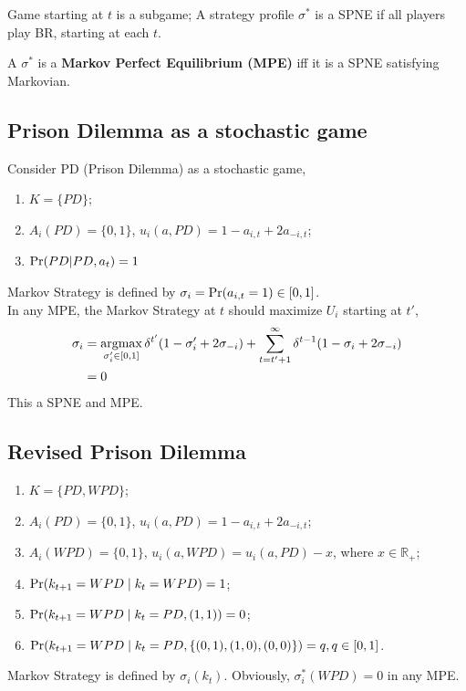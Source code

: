 \documentclass[11pt]{elegantbook}
\newcommand{\argmax}{\operatornamewithlimits{argmax}}
\begin{document}
Game starting at $t$ is a subgame; A strategy profile $\sigma^*$ is a SPNE if all players play BR, starting at each $t$.

\begin{definition}
    \normalfont
    A $\sigma^*$ is a \textbf{Markov Perfect Equilibrium (MPE)} iff it is a SPNE satisfying Markovian.
\end{definition}

\subsection{Prison Dilemma as a stochastic game}
Consider PD (Prison Dilemma) as a stochastic game,
\begin{enumerate}
    \item $K=\{PD\}$;
    \item $A_i(PD)=\{0,1\}$, $u_i(a,PD)=1-a_{i,t}+2 a_{-i,t}$;
    \item $\textnormal{Pr}(PD|PD,a_t)=1$
\end{enumerate}
Markov Strategy is defined by $\sigma_i=\textnormal{Pr}(a_{i,t}=1)\in[0,1]$.\\
In any MPE, the Markov Strategy at $t$ should maximize $U_i$ starting at $t'$,
\begin{equation}
    \begin{aligned}
        \sigma_i&=\argmax_{\sigma'_i\in[0,1]}\delta^{t'}(1-\sigma'_i+2\sigma_{-i})+\sum_{t=t'+1}^\infty \delta^{t-1}(1-\sigma_i+2\sigma_{-i})\\
        &=0
    \end{aligned}
    \nonumber
\end{equation}
This a SPNE and MPE.

\subsection{Revised Prison Dilemma}
\begin{enumerate}
    \item $K=\{PD,WPD\}$;
    \item $A_i(PD)=\{0,1\}$, $u_i(a,PD)=1-a_{i,t}+2 a_{-i,t}$;
    \item $A_i(WPD)=\{0,1\}$, $u_i(a,WPD)=u_i(a,PD)-x$, where $x\in \mathbb{R}_+$;
    \item $\textnormal{Pr}(k_{t+1}=WPD\mid k_t=WPD)=1$;
    \item $\textnormal{Pr}(k_{t+1}=WPD\mid k_t=PD, (1,1))=0$;
    \item $\textnormal{Pr}(k_{t+1}=WPD\mid k_t=PD, \{(0,1),(1,0),(0,0)\})=q, q\in [0,1]$.
\end{enumerate}
Markov Strategy is defined by $\sigma_i(k_t)$. Obviously, $\sigma^*_i(WPD)=0$ in any MPE.
\end{document}

